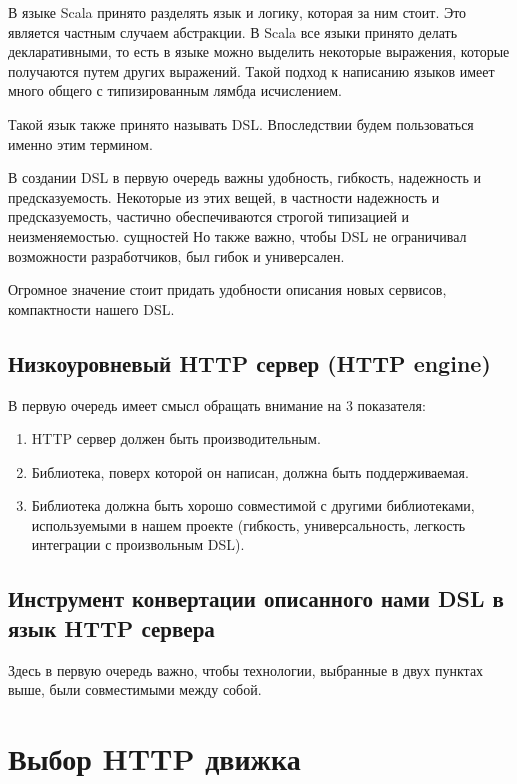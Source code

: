 \documentclass[14pt]{extarticle}
\begin{document}
    В языке Scala принято  разделять язык и логику, которая за ним стоит. Это является частным случаем абстракции.
    В Scala все языки принято делать декларативными, то есть в языке можно выделить некоторые выражения, которые
    получаются путем других выражений. Такой подход к написанию языков имеет много общего с типизированным лямбда
    исчислением.

    Такой язык также принято называть DSL. Впоследствии будем пользоваться именно этим термином.

    В создании DSL в первую очередь важны удобность, гибкость, надежность и
    предсказуемость. Некоторые из этих вещей, в частности надежность и предсказуемость, частично обеспечиваются строгой
    типизацией и
    неизменяемостью.
    сущностей
    Но также важно, чтобы DSL не ограничивал возможности разработчиков, был гибок и универсален.


    Огромное значение стоит придать удобности описания новых сервисов, компактности нашего DSL.
    \newpage
    \subsection{Низкоуровневый HTTP сервер (HTTP engine)}

    В первую очередь имеет смысл обращать внимание на 3 показателя:

    \begin{enumerate}
        \item HTTP сервер должен быть производительным.
        \item Библиотека, поверх которой он написан, должна быть поддерживаемая.
        \item Библиотека должна быть хорошо совместимой с другими библиотеками, используемыми в нашем проекте (гибкость,
        универсальность, легкость интеграции с произвольным DSL).
    \end{enumerate}

    \subsection{Инструмент конвертации описанного нами DSL в язык HTTP сервера}
    Здесь в первую очередь важно, чтобы технологии, выбранные в двух пунктах выше, были совместимыми между собой.

    \section{Выбор HTTP движка}
\end{document}
